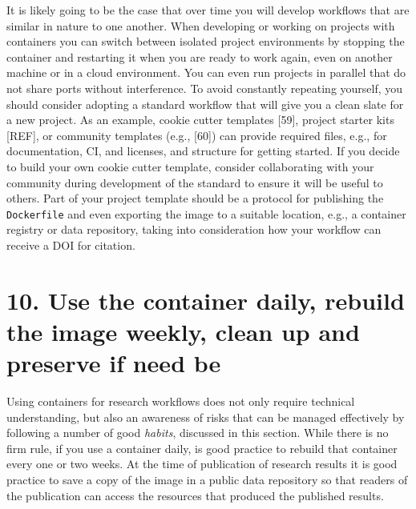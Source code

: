 \documentclass[10pt,letterpaper]{article}
\begin{document}
It is likely going to be the case that over time you will develop
workflows that are similar in nature to one another. When developing or
working on projects with containers you can switch between isolated
project environments by stopping the container and restarting it when
you are ready to work again, even on another machine or in a cloud
environment. You can even run projects in parallel that do not share
ports without interference. To avoid constantly repeating yourself, you
should consider adopting a standard workflow that will give you a clean
slate for a new project. As an example, cookie cutter templates
{[}59{]}, project starter kits {[}REF{]}, or community templates (e.g.,
{[}60{]}) can provide required files, e.g., for documentation, CI, and
licenses, and structure for getting started. If you decide to build your
own cookie cutter template, consider collaborating with your community
during development of the standard to ensure it will be useful to
others. Part of your project template should be a protocol for
publishing the \texttt{Dockerfile} and even exporting the image to a
suitable location, e.g., a container registry or data repository, taking
into consideration how your workflow can receive a DOI for citation.

\hypertarget{use-the-container-daily-rebuild-the-image-weekly-clean-up-and-preserve-if-need-be}{%
\section*{10. Use the container daily, rebuild the image weekly, clean
up and preserve if need
be}\label{use-the-container-daily-rebuild-the-image-weekly-clean-up-and-preserve-if-need-be}}

  \label{rule:usage} 

Using containers for research workflows does not only require technical
understanding, but also an awareness of risks that can be managed
effectively by following a number of good \emph{habits}, discussed in
this section. While there is no firm rule, if you use a container daily,
is good practice to rebuild that container every one or two weeks. At
the time of publication of research results it is good practice to save
a copy of the image in a public data repository so that readers of the
publication can access the resources that produced the published
results.
\end{document}
